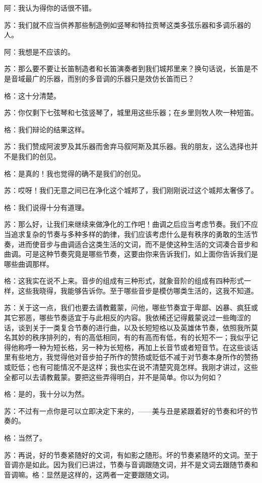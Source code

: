 \documentclass[11pt,oneside]{book}
\begin{document}
\begin{common-format}
阿：我认为得你的话很不错。

苏：我们就不应当供养那些制造例如竖琴和特拉贡琴这类多弦乐器和多调乐器的人。

阿：我想是不应该的。

苏：那么要不要让长笛制造者和长笛演奏者到我们城邦里来？换句话说，长笛是不是音域最广的乐器，而别的多音调的乐器只是效仿长笛而已？

格：这十分清楚。

苏：你仅剩下七弦琴和七弦竖琴了，城里用这些乐器；在乡里则牧人吹一种短笛。

格：我们辩论的结果这样。

苏：我们赞成阿波罗及其乐器而舍弃马叙阿斯及其乐器。我的朋友，这么选择也并不是我们的创见。

格：是真的！我也觉得的确不是我们的创见。

苏：哎呀！我们无意之间已在净化这个城邦了，我们刚刚说过这个城邦太奢侈了。

格：我们说得十分有道理。

苏：那么好，让我们来继续来做净化的工作吧！曲调之后应当考虑节奏。我们不应当追求复杂的节奏与多种多样的韵律，我们应该考虑什么是有秩序的勇敢的生活节奏，进而使音步与曲调适合这类生活的文词，而不是使这种生活的文词凑合音步和曲调。可是这种节奏究竟是哪些节奏，这要由你来告诉我们，如上面你告诉我们是哪些曲调那样。

格：这我实在说不上来。音步的组成有三种形式，就象音阶的组成有四种形式一样，这些我晓得，我能够告诉你。至于哪些音步是模仿哪类生活的，这我不知道。

苏：关于这一点，我们也要去请教戴蒙，问他，哪些节奏宜于卑鄙、凶暴、疯狂或其它邪恶，哪些节奏适宜于与此相反的内容。我依稀还记得戴蒙说过一些晦涩的话，谈到关于一类复合节奏的进行曲，以及长短短格以及英雄体节奏，依照我所莫名其妙的秩序排列的，有的高低相同，有的有高而有低，有的长短不一；我似乎记得他称呼一种为短长格，另一种为长短格，再加上长音节或者短音节。在这些谈话里有些地方，我觉得他对音步拍子所作的赞扬或贬低不减于对节奏本身所作的赞扬或贬低；也有可能情况不是这样；我也实在说不清楚究竟怎样。我刚才讲过，这些全都可以去请教戴蒙。要把这些弄得明白，并不是简单。你以为何如？

格：是的，我十分以为然。

苏：不过有一点你是可以立即决定下来的，——美与丑是紧跟着好的节奏和坏的节奏的。

格：当然了。

苏：再说，好的节奏紧随好的文词，有如影之随形。坏的节奏紧随坏的文词。至于音调亦是如此。因为我们已讲过，节奏与音调跟随文词，并不是文词去跟随节奏和音调嘛。格：显然是这样的，这两者一定要跟随文词。


\end{common-format}
\end{document}
